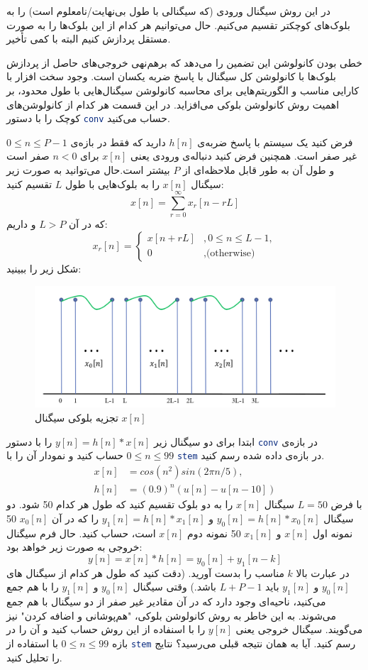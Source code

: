 \documentclass{utsignal}
\begin{document}
	در این روش سیگنال ورودی (که سیگنالی با طول بی‌نهایت/نامعلوم است) را به بلوک‌های کوچکتر تقسیم می‌کنیم. حال می‌توانیم هر کدام از این بلوک‌ها را به صورت مستقل پردازش کنیم البته با کمی تأخیر. 
	
	خطی بودن کانولوشن این تضمین را می‌دهد که برهم‌نهی  خروجی‌های حاصل از پردازش بلوک‌ها با کانولوشن کل سیگنال با پاسخ ضربه یکسان است. وجود سخت افزار با کارایی مناسب و الگوریتم‌‌هایی برای محاسبه کانولوشن سیگنال‌هایی با طول محدود، بر اهمیت روش کانولوشن بلوکی ‌می‌افزاید. در این قسمت هر کدام از کانولوشن‌های کوچک را با دستور \lstinline[language=Octave]{conv} حساب می‌کنید.
	
	فرض کنید یک سیستم با پاسخ ضربه‌ی $h[n]$ دارید که فقط در بازه‌ی $0\le n \le P-1$ غیر صفر است. همچنین فرض کنید دنباله‌ی ورودی یعنی $x[n]$ برای $n<0$ صفر است و طول آن به طور قابل ملاحظه‌ای از $P$ بیشتر است.حال می‌توانید به صورت زیر سیگنال $x[n]$ را به بلوک‌هایی با طول $L$ تقسیم کنید:
	$$
	x[n] = \sum_{r=0}^{\infty}x_r[n-rL]
	$$
	که در آن $L>P$ و داریم:
	$$
	x_r[n]=\begin{cases}
		x[n+rL]&, 0 \le n \le L-1,\\
		0&, \text{(otherwise)}
	\end{cases}
	$$
	شکل زیر را ببینید:
	\begin{figure}[h]
		\includegraphics[width=\linewidth]{segments.png}
		\caption{تجزیه بلوکی سیگنال $x[n]$}
	\end{figure}
	
	ابتدا برای دو سیگنال زیر $y[n]=h[n]*x[n]$ را با دستور \lstinline[language=Octave]{conv}  در بازه‌ی $0\le n \le 99$ حساب کنید و نمودار آن را با \lstinline[language=Octave]{stem} در بازه‌ی داده شده رسم کنید.
	\begin{align*}
	x[n] &= cos(n^2)sin(2\pi n/5),\\
	h[n]‌&= (0.9)^n(u[n]-u[n-10])
	\end{align*}
	با فرض $L=50$ سیگنال $x[n]$ را به دو بلوک تقسیم کنید که طول هر کدام 50 شود. دو سیگنال $y_0[n]=h[n]*x_0[n]$ و $y_1[n]=h[n]*x_1[n]$ را که در آن $x_0[n]$ 50 نمونه اول $x[n]$ و $x_1[n]$ 50 نمونه دوم $x[n]$ است، حساب کنید. حال فرم سیگنال خروجی به صورت زیر خواهد بود:
	$$y[n]=x[n]*h[n] = y_0[n] + y_1[n-k]$$
	در عبارت بالا $k$ مناسب را بدست آورید. (دقت کنید که طول هر کدام از سیگنال های $y_0[n]$ و $y_1[n]$ باید $L+P-1$ باشد.) وقتی سیگنال $y_0[n]$ و $y_1[n]$ را با هم جمع می‌کنید، ناحیه‌ای وجود دارد که در آن مقادیر غیر صفر از دو سیگنال با هم جمع می‌شوند. به این خاطر به روش کانولوشن بلوکی، "هم‌پوشانی و اضافه کردن" نیز می‌گویند. سیگنال خروجی یعنی $y[n]$ را با اسنفاده از این روش حساب کنید و آن را در بازه $0\le n \le 99$ با استفاده از \lstinline[language=Octave]{stem} رسم کنید. آیا به همان نتیجه قبلی می‌رسید؟ نتایج را تحلیل کنید.
	
\end{document}
